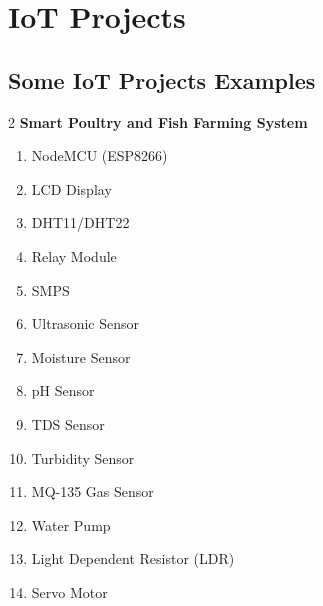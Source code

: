 \chapter{IoT Projects}

\section{Some IoT Projects Examples}

\begin{multicols}{2}
\textbf{Smart Poultry and Fish Farming System}
\begin{enumerate}
   \item NodeMCU (ESP8266)
   \item LCD Display
   \item DHT11/DHT22
   \item Relay Module
   \item SMPS
   \item Ultrasonic Sensor
   \item Moisture Sensor
   \item pH Sensor
   \item TDS Sensor
   \item Turbidity Sensor
   \item MQ-135 Gas Sensor
   \item Water Pump
   \item Light Dependent Resistor (LDR)
   \item Servo Motor
\end{enumerate}








\end{multicols}
